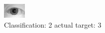 \begin{figure}[h!]
\begin{center}
\includegraphics[width=0.60\columnwidth]{figures/ID1157_class_2_target_3.png}
\end{center}
\caption{ Classification: 2 actual target: 3}
\label{fig:ID1157_class_2_target_3}
\end{figure}

